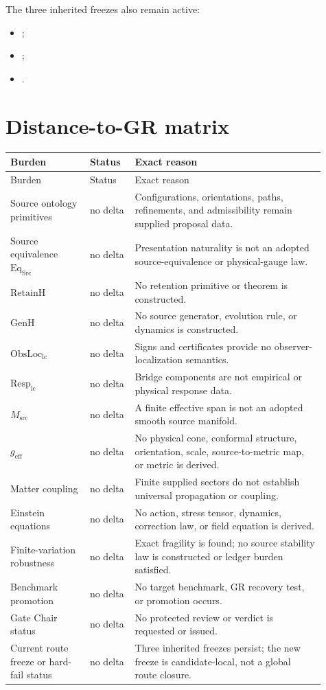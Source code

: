 \documentclass[11pt]{article}
\begin{document}
The three inherited freezes also remain active:
\begin{itemize}
 \item {};
 \item {};
 \item {}.
\end{itemize}

\section{Distance-to-GR matrix}

\small
\begin{longtable}{P{0.23\linewidth}P{0.13\linewidth}P{0.55\linewidth}}
\toprule
Burden & Status & Exact reason \\
\midrule
\endfirsthead
\toprule
Burden & Status & Exact reason \\
\midrule
\endhead
Source ontology primitives & no delta & Configurations, orientations, paths, refinements, and admissibility remain supplied proposal data.\\
Source equivalence $\mathrm{Eq}_{\mathrm{Src}}$ & no delta & Presentation naturality is not an adopted source-equivalence or physical-gauge law.\\
$\mathrm{RetainH}$ & no delta & No retention primitive or theorem is constructed.\\
$\mathrm{GenH}$ & no delta & No source generator, evolution rule, or dynamics is constructed.\\
$\mathrm{ObsLoc}_{\mathrm{lc}}$ & no delta & Signs and certificates provide no observer-localization semantics.\\
$\mathrm{Resp}_{\mathrm{lc}}$ & no delta & Bridge components are not empirical or physical response data.\\
$M_{\mathrm{src}}$ & no delta & A finite effective span is not an adopted smooth source manifold.\\
$g_{\mathrm{eff}}$ & no delta & No physical cone, conformal structure, orientation, scale, source-to-metric map, or metric is derived.\\
Matter coupling & no delta & Finite supplied sectors do not establish universal propagation or coupling.\\
Einstein equations & no delta & No action, stress tensor, dynamics, correction law, or field equation is derived.\\
Finite-variation robustness & no delta & Exact fragility is found; no source stability law is constructed or ledger burden satisfied.\\
Benchmark promotion & no delta & No target benchmark, GR recovery test, or promotion occurs.\\
Gate Chair status & no delta & No protected review or verdict is requested or issued.\\
Current route freeze or hard-fail status & no delta & Three inherited freezes persist; the new freeze is candidate-local, not a global route closure.\\
\bottomrule
\end{longtable}
\normalsize
\end{document}
